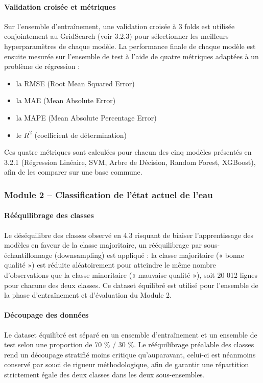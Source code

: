 \documentclass[a4paper,12pt, oneside]{article}
\begin{document}
\paragraph{Validation croisée et métriques\\}
Sur l'ensemble d'entraînement, une validation croisée à 3 folds est utilisée conjointement au GridSearch (voir 3.2.3) pour sélectionner les meilleurs hyperparamètres de chaque modèle. La performance finale de chaque modèle est ensuite mesurée sur l'ensemble de test à l'aide de quatre métriques adaptées à un problème de régression :
\begin{itemize}
    \item la RMSE (Root Mean Squared Error)
    \item la MAE (Mean Absolute Error)
    \item la MAPE (Mean Absolute Percentage Error)
    \item le $R^2$ (coefficient de détermination)
\end{itemize}
Ces quatre métriques sont calculées pour chacun des cinq modèles présentés en 3.2.1 (Régression Linéaire, SVM, Arbre de Décision, Random Forest, XGBoost), afin de les comparer sur une base commune.

\subsubsection[Classification de l'état actuel de l'eau]{Module 2 -- Classification de l'état actuel de l'eau\\}

\paragraph{Rééquilibrage des classes\\}
Le déséquilibre des classes observé en 4.3 risquant de biaiser l'apprentissage des modèles en faveur de la classe majoritaire, un rééquilibrage par sous-échantillonnage (downsampling) est appliqué : la classe majoritaire (« bonne qualité ») est réduite aléatoirement pour atteindre le même nombre d'observations que la classe minoritaire (« mauvaise qualité »), soit 20 012 lignes pour chacune des deux classes. Ce dataset équilibré est utilisé pour l'ensemble de la phase d'entraînement et d'évaluation du Module 2.

\paragraph{Découpage des données\\}
Le dataset équilibré est séparé en un ensemble d'entraînement et un ensemble de test selon une proportion de 70 \% / 30 \%. Le rééquilibrage préalable des classes rend un découpage stratifié moins critique qu'auparavant, celui-ci est néanmoins conservé par souci de rigueur méthodologique, afin de garantir une répartition strictement égale des deux classes dans les deux sous-ensembles.
\end{document}

